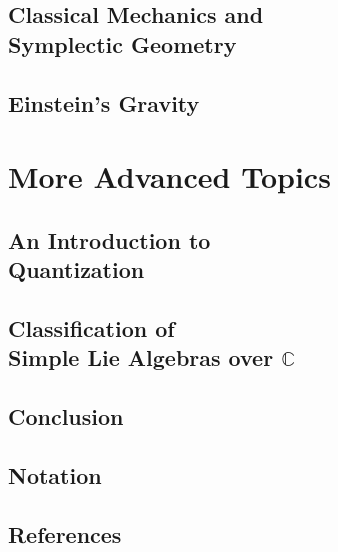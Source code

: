 \documentclass[12pt, twoside, openany]{book}
\newcommand{\1}{\mathbbm{1}}
\begin{document}
\chapter[Classical Mechanics and Symplectic Geometry]{Classical Mechanics and\\ Symplectic Geometry}\label{ch:Symplectic}

\chapter{Einstein's Gravity}\label{ch:GR}

\part{More Advanced Topics}\thispagestyle{empty}

\chapter[An Introduction to Quantization]{An Introduction to \\Quantization}

\chapter[Classification of Simple Lie Algebras over $\mathbb C$]{Classification of\\ Simple Lie Algebras over $\mathbb{C}$}

\chapter*{Conclusion}\thispagestyle{empty}



\chapter*{Notation}\thispagestyle{empty}

\chapter*{References}\thispagestyle{empty}


\printindex
\end{document}
